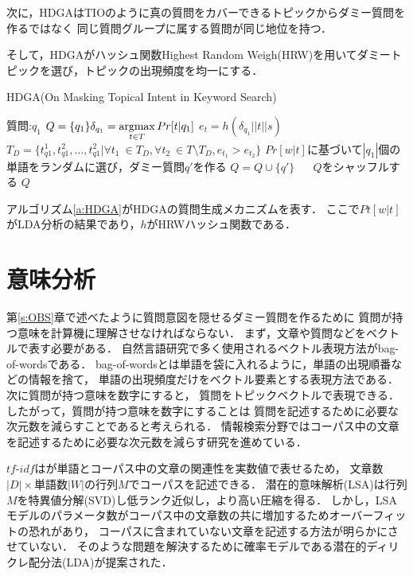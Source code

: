 \documentclass[master]{suribt}
\theoremstyle{definition}
\newcommand{\argmax}{\mathop{\rm argmax}\limits}
\begin{document}
 次に，HDGAはTIOのように真の質問をカバーできるトピックからダミー質問を作るではなく
 同じ質問グループに属する質問が同じ地位を持つ．

 そして，HDGAがハッシュ関数Highest Random Weigh(HRW)\cite{hrw1998}を用いてダミートピックを選び，トピックの出現頻度を均一にする．

 \begin{algorithm}
 \caption{HDGA(On Masking Topical Intent in Keyword Search)}
 \begin{algorithmic}[1]
  \Require 質問:$q_1$
  \State $Q = \{q_1\}\delta_{q_1} = \argmax_{t \in T} Pr[t|q_1]$
  \State $e_t = h(\delta_{q_1}||t||s)$
  \EndFor
  \State $T_D = \{t^1_{q1},t^2_{q1}, \dots , t^2_{q1} | \forall t_1 \ \in T_D , \forall t_2 \ \in T \setminus T_D, e_{t_1} > e_{t_2} \}$
  \While { $ \argmax_{t \in T} Pr[t|q'] \neq t$}
  \State $Pr[w|t]$に基づいて$|q_1|$個の単語をランダムに選び，ダミー質問$q'$を作る
  \EndWhile
  \State $Q = Q \cup \{q'\}$
  \EndFor　
  \State $Q$をシャッフルする
  \Ensure $Q$
 \end{algorithmic}
 \label{a:HDGA}
 \end{algorithm}

 アルゴリズム\ref{a:HDGA}がHDGAの質問生成メカニズムを表す．
 ここで$Pt[w|t]$がLDA分析の結果であり，$h$がHRWハッシュ関数である．

 \chapter{意味分析} \label{s:sm}
 第\ref{s:OBS}章で述べたように質問意図を隠せるダミー質問を作るために
 質問が持つ意味を計算機に理解させなければならない．
 まず，文章や質問などをベクトルで表す必要がある．
 自然言語研究で多く使用されるベクトル表現方法がbag-of-wordsである．
 bag-of-wordsとは単語を袋に入れるように，単語の出現順番などの情報を捨て，
 単語の出現頻度だけをベクトル要素とする表現方法である．
 次に質問が持つ意味を数字にすると，
 質問をトピックベクトルで表現できる．
 したがって，質問が持つ意味を数字にすることは
 質問を記述するために必要な次元数を減らすことであると考えられる．
 情報検索分野ではコーパス中の文章を記述するために必要な次元数を減らす研究を進めている．

 $tf\text{-}idf$はが単語とコーパス中の文章の関連性を実数値で表せるため，
 文章数$|D| \times$単語数$|W|$の行列$M$でコーパスを記述できる．
 潜在的意味解析(LSA)は行列$M$を特異値分解(SVD)し低ランク近似し，より高い圧縮を得る．
 しかし，LSAモデルのパラメータ数がコーパス中の文章数の共に増加するためオーバーフィットの恐れがあり，
 コーパスに含まれていない文章を記述する方法が明らかにさせていない．
 そのような問題を解決するために確率モデルである潜在的ディリクレ配分法(LDA)が提案された．
\end{document}
